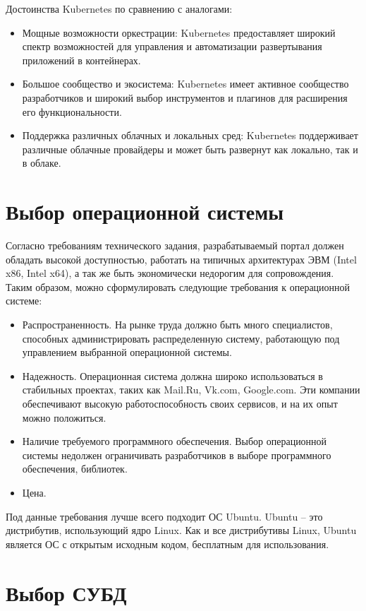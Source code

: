 Достоинства Kubernetes по сравнению с аналогами:
\begin{itemize}
    \item Мощные возможности оркестрации: Kubernetes предоставляет широкий спектр возможностей для управления и автоматизации развертывания приложений в контейнерах.
    \item Большое сообщество и экосистема: Kubernetes имеет активное сообщество разработчиков и широкий выбор инструментов и плагинов для расширения его функциональности.
    \item Поддержка различных облачных и локальных сред: Kubernetes поддерживает различные облачные провайдеры и может быть развернут как локально, так и в облаке.
\end{itemize}

\section{Выбор операционной системы}
Согласно требованиям технического задания, разрабатываемый портал должен обладать высокой доступностью, работать на типичных архитектурах ЭВМ (Intel x86, Intel x64), а так же быть экономически недорогим для сопровождения. Таким образом, можно сформулировать следующие требования к операционной системе:
\begin{itemize}
    \item Распространенность. На рынке труда должно быть много специалистов, способных администрировать распределенную систему, работающую под управлением выбранной операционной системы.
    \item Надежность. Операционная система должна широко использоваться в стабильных проектах, таких как Mail.Ru, Vk.com, Google.com. Эти компании обеспечивают высокую работоспособность своих сервисов, и на их опыт можно положиться.
    \item Наличие требуемого программного обеспечения. Выбор операционной системы недолжен ограничивать разработчиков в выборе программного обеспечения, библиотек.
    \item Цена.
\end{itemize}

Под данные требования лучше всего подходит ОС Ubuntu. Ubuntu -- это дистрибутив, использующий ядро Linux. Как и все дистрибутивы Linux, Ubuntu является ОС с открытым исходным кодом, бесплатным для использования. 

\section{Выбор СУБД}

